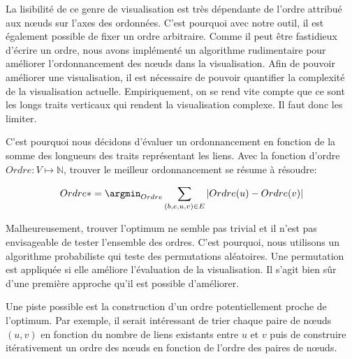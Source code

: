 La lisibilité de ce genre de visualisation est très dépendante de l'ordre attribué aux n\oe{}uds sur l'axes des ordonnées.
C'est pourquoi avec notre outil, il est également possible de fixer un ordre arbitraire.
Comme il peut être fastidieux d'écrire un ordre, nous avons implémenté un algorithme rudimentaire pour améliorer l'ordonnancement des n\oe{}uds dans la visualisation.
Afin de pouvoir améliorer une visualisation, il est nécessaire de pouvoir quantifier la complexité de la visualisation actuelle.
Empiriquement, on se rend vite compte que ce sont les longs traits verticaux qui rendent la visualisation complexe.
Il faut donc les limiter.

C'est pourquoi nous décidons d'évaluer un ordonnancement en fonction de la somme des longueurs des traits représentant les liens.
Avec la fonction d'ordre $Ordre: V \longmapsto \mathbb{N}$, trouver le meilleur ordonnancement se résume à résoudre:

\begin{equation}
 Ordre* = \argmin_{Ordre}  \sum_{(b,e,u,v) \in E} |Ordre(u)- Ordre(v)|
\end{equation}

Malheureusement, trouver l'optimum ne semble pas trivial et il n'est pas envisageable de tester l'ensemble des ordres.
C'est pourquoi, nous utilisons un algorithme probabiliste qui teste des permutations aléatoires.
Une permutation est appliquée si elle améliore l'évaluation de la visualisation.
Il s'agit bien sûr d'une première approche qu'il est possible d'améliorer.

Une piste possible est la construction d'un ordre potentiellement proche de l'optimum.
Par exemple, il serait intéressant de trier chaque paire de n\oe{}uds $(u,v)$ en fonction du nombre de liens existants entre $u$ et $v$ puis de construire itérativement un ordre des n\oe{}uds en fonction de l'ordre des paires de n\oe{}uds.